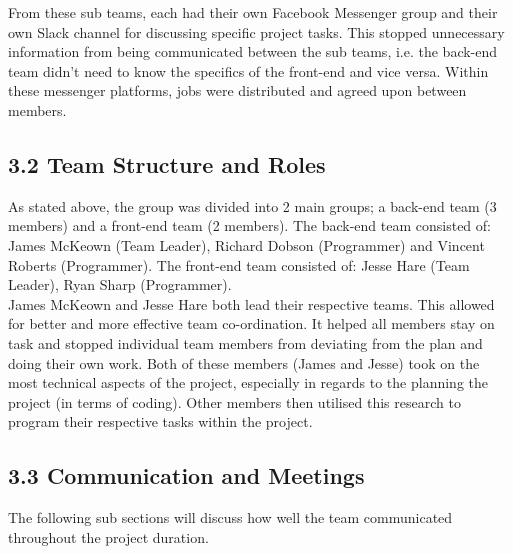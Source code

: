 \documentclass[11pt]{article}
\begin{document}
From these sub teams, each had their own Facebook Messenger group and their own Slack channel for discussing specific project tasks. This stopped unnecessary information from being communicated between the sub teams, i.e. the back-end team didn't need to know the specifics of the front-end and vice versa. Within these messenger platforms, jobs were distributed and agreed upon between members.

\subsection{3.2 Team Structure and Roles}
As stated above, the group was divided into 2 main groups;  a back-end team (3 members) and a front-end team (2 members). The back-end team consisted of: James McKeown (Team Leader), Richard Dobson (Programmer) and Vincent Roberts (Programmer). The front-end team consisted of: Jesse Hare (Team Leader), Ryan Sharp (Programmer). \\

James McKeown and Jesse Hare both lead their respective teams. This allowed for better and more effective team co-ordination. It helped all members stay on task and stopped individual team members from deviating from the plan and doing their own work. Both of these members (James and Jesse) took on the most technical aspects of the project, especially in regards to the planning the project (in terms of coding). Other members then utilised this research to program their respective tasks within the project. 


\subsection{3.3 Communication and Meetings}
The following sub sections will discuss how well the team communicated throughout the project duration.
\end{document}
